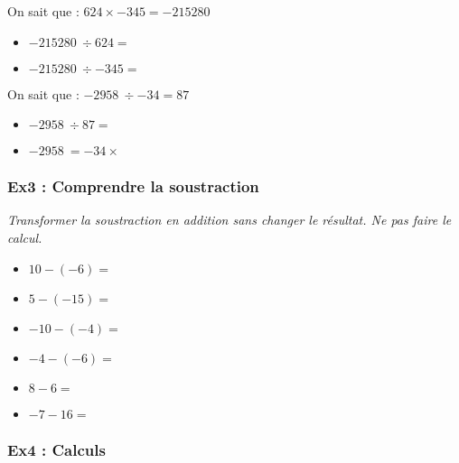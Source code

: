 \begin{multicols}{2}

On sait que : $624 \times -345 = \SI{-215 280}{}$
\begin{itemize}[label={$\bullet$}]
  \item $\SI{-215 280}{} \div 624 =$ \dotfill
  \item $\SI{-215 280}{} \div -345 = $ \dotfill
\end{itemize}

On sait que : $\SI{-2 958}{} \div -34 = 87$
\begin{itemize}[label={$\bullet$}]
  \item $\SI{-2 958}{} \div 87 =$ \dotfill
  \item $\SI{-2 958}{} = -34 \times $ \dotfill
\end{itemize}

\end{multicols}

\subsubsection*{Ex3 : Comprendre la soustraction}

\textit{Transformer la soustraction en addition sans changer le résultat. Ne pas faire le calcul.}

\begin{multicols}{3}

\begin{itemize}[label={$\bullet$}]
  \item $10 - (-6) = $ \dotfill
  \item $5 - (-15) = $ \dotfill
  \item $-10 - (-4) = $ \dotfill
  \item $-4 - (-6) = $ \dotfill
  \item $8 - 6 = $ \dotfill
  \item $-7 - 16 = $ \dotfill
\end{itemize}

\end{multicols}

\subsubsection*{Ex4 : Calculs}


